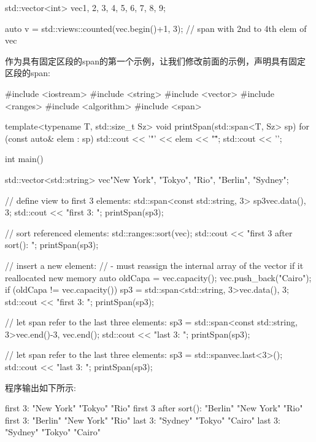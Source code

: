 \begin{cpp}
std::vector<int> vec{1, 2, 3, 4, 5, 6, 7, 8, 9};

auto v = std::views::counted(vec.begin()+1, 3); // span with 2nd to 4th elem of vec
\end{cpp}


作为具有固定区段的span的第一个示例，让我们修改前面的示例，声明具有固定区段的span:


\begin{cpp}
#include <iostream>
#include <string>
#include <vector>
#include <ranges>
#include <algorithm>
#include <span>

template<typename T, std::size_t Sz>
void printSpan(std::span<T, Sz> sp)
{
	for (const auto& elem : sp) {
		std::cout << '"' << elem << "\" ";
	}
	std::cout << '\n';
}

int main()
{
	std::vector<std::string> vec{"New York", "Tokyo", "Rio", "Berlin", "Sydney"};

	// define view to first 3 elements:
	std::span<const std::string, 3> sp3{vec.data(), 3};
	std::cout << "first 3: ";
	printSpan(sp3);

	// sort referenced elements:
	std::ranges::sort(vec);
	std::cout << "first 3 after sort(): ";
	printSpan(sp3);

	// insert a new element:
	// - must reassign the internal array of the vector if it reallocated new memory
	auto oldCapa = vec.capacity();
	vec.push_back("Cairo");
	if (oldCapa != vec.capacity()) {
		sp3 = std::span<std::string, 3>{vec.data(), 3};
	}
	std::cout << "first 3: ";
	printSpan(sp3);

	// let span refer to the last three elements:
	sp3 = std::span<const std::string, 3>{vec.end()-3, vec.end()};
	std::cout << "last 3: ";
	printSpan(sp3);

	// let span refer to the last three elements:
	sp3 = std::span{vec}.last<3>();
	std::cout << "last 3: ";
	printSpan(sp3);
}
\end{cpp}

程序输出如下所示:

\begin{shell}
first 3:              "New York" "Tokyo" "Rio"
first 3 after sort(): "Berlin" "New York" "Rio"
first 3: "Berlin" "New York" "Rio"
last 3: "Sydney" "Tokyo" "Cairo"
last 3: "Sydney" "Tokyo" "Cairo"
\end{shell}

